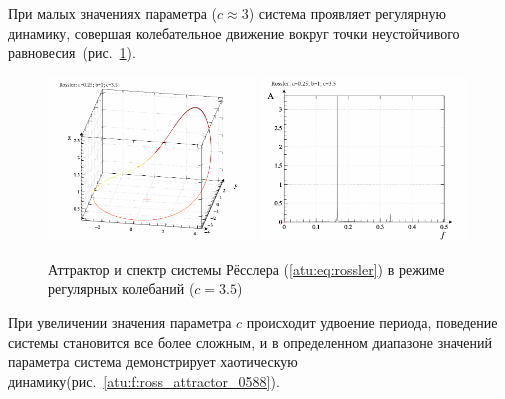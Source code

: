 При малых значениях параметра (\(c \approx 3 \))
система проявляет регулярную динамику,
совершая колебательное движение вокруг точки
неустойчивого равновесия~(рис.~\ref{atu:f:ross_attractor_0300}).

\begin{figure}[ht!]
\begin{center}
  \includegraphics[width=0.49\textwidth]{p/cha/ross/ross0-p_xyz_c=03x50.png}
  \hfill
  \includegraphics[width=0.49\textwidth]{p/cha/ross/ross_f-p_f_c=03x50.png}
\end{center}
  \caption{Аттрактор и спектр системы Рёсслера (\ref{atu:eq:rossler}) в режиме регулярных колебаний ($c=3.5$)}
\label{atu:f:ross_attractor_0300}
\end{figure}

При увеличении значения параметра \(c\) происходит удвоение периода,
поведение системы становится все более сложным, и в определенном
диапазоне значений параметра система демонстрирует
хаотическую динамику(рис.~\ref{atu:f:ross_attractor_0588}).

